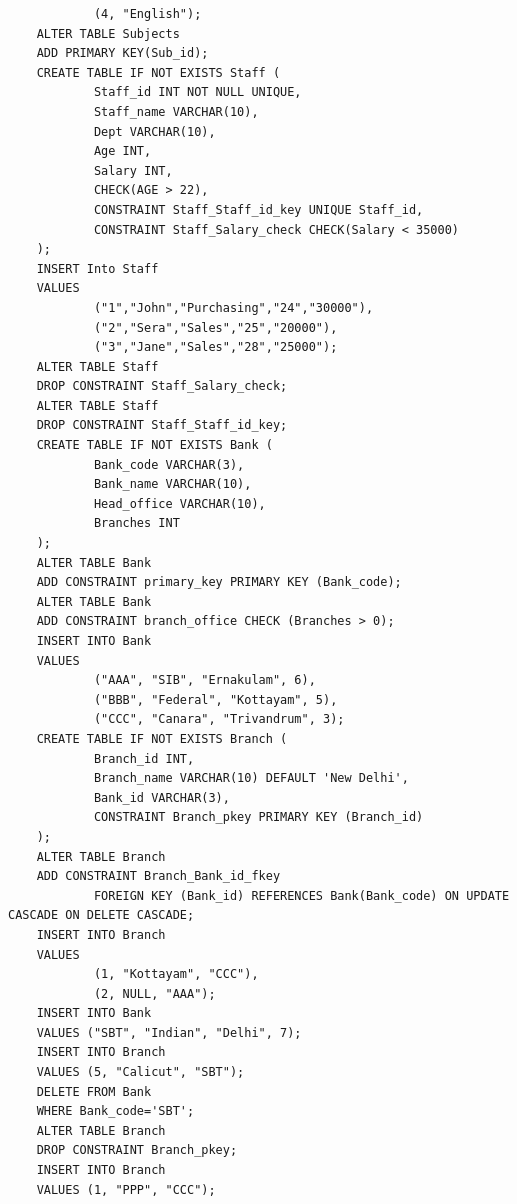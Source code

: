 \documentclass[13pt,oneside]{book}
\begin{document}
\begin{itemize}
\begin{verbatim}
			(4, "English");
	ALTER TABLE Subjects
	ADD PRIMARY KEY(Sub_id);
	CREATE TABLE IF NOT EXISTS Staff (
			Staff_id INT NOT NULL UNIQUE,
			Staff_name VARCHAR(10),
			Dept VARCHAR(10),
			Age INT,
			Salary INT,
			CHECK(AGE > 22), 
			CONSTRAINT Staff_Staff_id_key UNIQUE Staff_id,
			CONSTRAINT Staff_Salary_check CHECK(Salary < 35000)
	);
	INSERT Into Staff
	VALUES
			("1","John","Purchasing","24","30000"),
			("2","Sera","Sales","25","20000"),
			("3","Jane","Sales","28","25000");
	ALTER TABLE Staff
	DROP CONSTRAINT Staff_Salary_check;
	ALTER TABLE Staff
	DROP CONSTRAINT Staff_Staff_id_key;
	CREATE TABLE IF NOT EXISTS Bank (
			Bank_code VARCHAR(3),
			Bank_name VARCHAR(10),
			Head_office VARCHAR(10),
			Branches INT
	);
	ALTER TABLE Bank
	ADD CONSTRAINT primary_key PRIMARY KEY (Bank_code);
	ALTER TABLE Bank
	ADD CONSTRAINT branch_office CHECK (Branches > 0);
	INSERT INTO Bank
	VALUES
			("AAA", "SIB", "Ernakulam", 6),
			("BBB", "Federal", "Kottayam", 5),
			("CCC", "Canara", "Trivandrum", 3);
	CREATE TABLE IF NOT EXISTS Branch (
			Branch_id INT,
			Branch_name VARCHAR(10) DEFAULT 'New Delhi',
			Bank_id VARCHAR(3),
			CONSTRAINT Branch_pkey PRIMARY KEY (Branch_id) 
	);
	ALTER TABLE Branch
	ADD CONSTRAINT Branch_Bank_id_fkey 
			FOREIGN KEY (Bank_id) REFERENCES Bank(Bank_code) ON UPDATE CASCADE ON DELETE CASCADE;
	INSERT INTO Branch
	VALUES
			(1, "Kottayam", "CCC"),
			(2, NULL, "AAA");
	INSERT INTO Bank
	VALUES ("SBT", "Indian", "Delhi", 7);
	INSERT INTO Branch
	VALUES (5, "Calicut", "SBT");
	DELETE FROM Bank
	WHERE Bank_code='SBT';
	ALTER TABLE Branch
	DROP CONSTRAINT Branch_pkey;
	INSERT INTO Branch
	VALUES (1, "PPP", "CCC");
	

\end{verbatim}
\end{itemize}
\end{document}
